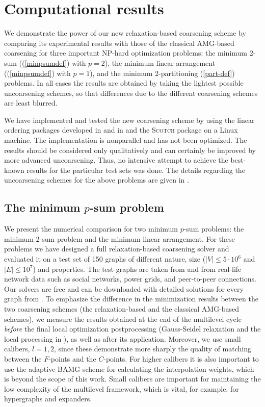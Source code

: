 \documentclass[final]{siamltex}
\newcommand{\scotch}{\textsc{Scotch}}
\begin{document}
\section{Computational results}\label{results}
\par We demonstrate the power of our new relaxation-based coarsening scheme by comparing its experimental
results with those of the
classical AMG-based coarsening
for three important NP-hard optimization problems: the minimum 2-sum
((\ref{minpsumdef}) with $p=2$), the minimum linear arrangement ((\ref{minpsumdef}) with $p=1$), and the minimum 2-partitioning (\ref{part-def}) problems. In all cases
the results are obtained by taking the lightest possible
uncoarsening schemes, so that differences due to the different coarsening schemes are least blurred.
\par We have implemented and tested the new coarsening scheme by
using the linear ordering packages developed in \cite{safro2004} and in \cite{safro2003} and the \scotch{} package \cite{webscotch} on a Linux
machine. The implementation is nonparallel and has not been
optimized. The results should be considered only qualitatively and
can certainly be improved by more advanced uncoarsening.
Thus, no intensive attempt to achieve the best-known
results for the particular test sets was done. The details
regarding the uncoarsening schemes for the above problems are
given in \cite{safro2004,safro2003,cheval-mlpartcompar}.
\subsection{The minimum $p$-sum problem}


\par We present the numerical comparison for two minimum $p$-sum problems: the minimum 2-sum problem and the minimum linear arrangement. For these problems we have designed a full relaxation-based
coarsening solver and evaluated it on a test set of 150 graphs of
different nature, size ($|V| \leq 5\cdot 10^6$ and $|E| \leq 10^7$)
and properties. The test graphs are taken from
\cite{davis} and from real-life network data such as social networks, power grids, and peer-to-peer connections. Our solvers are free and can be downloaded with
detailed solutions for every graph from \cite{safroproj}.
To emphasize the difference in the minimization results
between the two coarsening schemes (the relaxation-based and the classical AMG-based schemes), we measure the results
obtained at the end of the multilevel cycle {\it before} the final local
optimization postprocessing (Gauss-Seidel relaxation and the local processing in \cite{safro2004,safro2003}),
as well as after its application. Moreover, we use small calibers, $l=1,2$, since these demonstrate
more sharply the quality of matching between the $F$-points and
the $C$-points. For higher calibers it is also important to use
the adaptive BAMG scheme \cite{amg} for
calculating the interpolation weights, which is beyond the scope
of this work. Small calibers are important for maintaining the
low complexity of the multilevel framework, which is vital, for example, for hypergraphs and expanders.
\end{document}
